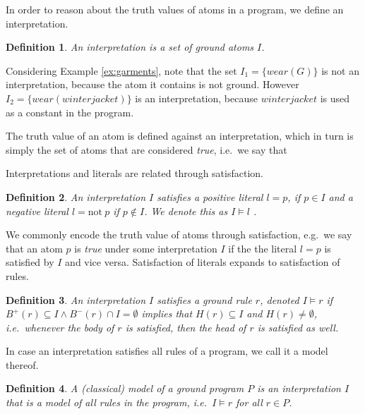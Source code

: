\documentclass{vutinfth} %
\newtheorem{definition}{Definition}[chapter]
\newcommand{\headf}{H}
\newcommand{\bodyf}{B}
\newcommand{\fail}{\mathrm{not } \ \xspace}
\begin{document}
In order to reason about the truth values of atoms in a program, we define an interpretation.

\begin{definition}
An \emph{interpretation} is a set of ground atoms $I$.
\end{definition}


Considering Example \ref{ex:garments}, note that the set $I_1 = \{ wear(G) \}$ is not an interpretation, because the atom it contains is not ground. However $I_2 = \{ wear(winterjacket) \}$ is an interpretation, because $winterjacket$ is used as a constant in the program.

The truth value of an atom is defined against an interpretation, which in turn is simply the set of atoms that are considered \emph{true}, i.e.~we say that 

Interpretations and literals are related through satisfaction.

\begin{definition}
An interpretation $I$ \emph{satisfies} a positive literal $l = p$, if $p \in I$ and a negative literal $l = \fail p$ if $p \not \in I$. We denote this as $I \models l$ .
\end{definition}

We commonly encode the truth value of atoms through satisfaction, e.g.~we say that an atom $p$ is \emph{true} under some interpretation $I$ if the the literal $l = p$ is satisfied by $I$ and vice versa. Satisfaction of literals expands to satisfaction of rules. \cite{ryan}

\begin{definition}
\label{def:rule-model}
An interpretation $I$ \emph{satisfies} a ground rule $r$, denoted $I \models r$ if $\bodyf^+(r) \subseteq I \wedge \bodyf^-(r) \cap I = \emptyset$ implies that $\headf(r) \subseteq I$ and $\headf(r) \not = \emptyset$, i.e.~whenever the body of $r$ is satisfied, then the head of $r$ is satisfied as well.
\end{definition}

In case an interpretation satisfies all rules of a program, we call it a model thereof.

\begin{definition}
A \emph{(classical) model} of a ground program $P$ is an interpretation $I$ that is a model of all rules in the program, i.e.~$I \models r$ for all $r \in P$.
\end{definition}
\end{document}
